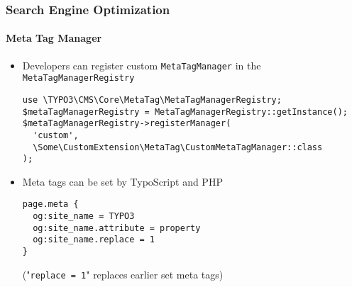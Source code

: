 \begin{frame}[fragile]
	\frametitle{Search Engine Optimization}
	\framesubtitle{Meta Tag Manager}

	\lstset{basicstyle=\tiny\ttfamily}

	\begin{itemize}
		\item Developers can register custom \texttt{MetaTagManager} in the
			\texttt{MetaTagManagerRegistry}

\begin{lstlisting}
use \TYPO3\CMS\Core\MetaTag\MetaTagManagerRegistry;
$metaTagManagerRegistry = MetaTagManagerRegistry::getInstance();
$metaTagManagerRegistry->registerManager(
  'custom',
  \Some\CustomExtension\MetaTag\CustomMetaTagManager::class
);
\end{lstlisting}

		\item Meta tags can be set by TypoScript and PHP

\begin{lstlisting}
page.meta {
  og:site_name = TYPO3
  og:site_name.attribute = property
  og:site_name.replace = 1
}
\end{lstlisting}

			\smaller
				("\texttt{replace = 1}" replaces earlier set meta tags)
			\normalsize

	\end{itemize}

\end{frame}

